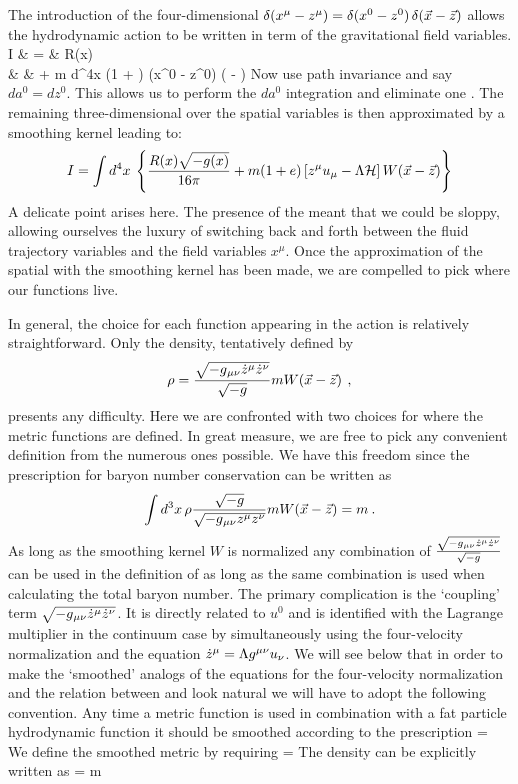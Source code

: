 The introduction of the four-dimensional \dfunc $\delta(x^{\mu} -
z^{\mu}) = \delta(x^0 - z^0) \, \delta(\vec {x} - \vec {z})$ allows the
hydrodynamic action to be written in term of the gravitational
field variables. \beas
I & = &   R(x)  \\
  &   & + m  d^4x \push (1 + \erg)  \gd(x^0 - z^0) \gd( - ) \eeas Now
use path invariance and say $da^0 = dz^0$.  This allows us to
perform the $da^0$ integration and eliminate one \dfunc. The
remaining three-dimensional \dfunc over the spatial variables is
then approximated by a smoothing kernel leading to:
\[
I =  \int d^4x \: \left\{ { \frac{R(x) \sqrt{-g(x)}}{16 \pi} + m
(1 + e) \left[ {  {z}{{}^{\mu} }   {u}{{}_{\mu} }  - \Lambda\mathcal{H} } \right]
W\!\left( {\vec {x} - \vec {z}} \right) } \right\}
\]
A delicate point arises here.  The presence of the \dfuncs meant
that we could be sloppy, allowing ourselves the luxury of
switching back and forth between the fluid trajectory variables
\ptraj{\gm} and the field variables $x^\mu$.  Once the
approximation of the spatial \dfuncs with the smoothing kernel has
been made, we are compelled to pick where our functions live.

In general, the choice for each function appearing in the action
is relatively straightforward.  Only the density, tentatively
defined by
\[
  \rho = \frac { \sqrt{- {g}{{}_{\mu \nu} }   {\dot {{z}}}{{}^{\mu} }   {\dot {{z}}}{{}^{\nu} } }}
              { \sqrt{-g}} m W\!\left( {\vec {x} - \vec {z}} \right) \: ,
\]
presents any difficulty.  Here we are confronted with two choices
for where the metric functions are defined.  In great measure, we
are free to pick any convenient definition from the numerous ones
possible. We have this freedom since the prescription for baryon
number conservation can be written as
\[
  \int d^3x \, \rho \frac{ \sqrt{-g}}
                         { \sqrt{- {g}{{}_{\mu \nu} }   {z}{{}^{\mu} }   {z}{{}^{\nu} } }}
                         m W\!\left( {\vec {x} - \vec {z}} \right)
  = m \: .
\]
As long as the smoothing kernel $W$ is normalized any combination
of $\frac{ \sqrt{- {g}{{}_{\mu \nu} }   {\dot {{z}}}{{}^{\mu} }   {\dot {{z}}}{{}^{\nu} }  }}{
\sqrt{-g}}$ can be used in the definition of \gr as long as the
same combination is used when calculating the total baryon number.
The primary complication is the `coupling' term
$\sqrt{- {g}{{}_{\mu \nu} }   {\dot {{z}}}{{}^{\mu} }   {\dot {{z}}}{{}^{\nu} }  }$. It is
directly related to $u^0$ and is identified with the Lagrange
multiplier \gL in the continuum case by simultaneously using the
four-velocity normalization and the equation $ {\dot {{z}}}{{}^{\mu} }  = \Lambda
 {g}{\ensuremath{{}^{\mu \nu} } }   {u}{\ensuremath{{}_{\nu} } } $.  We will see below that in order to
make the `smoothed' analogs of the equations for the four-velocity
normalization and the relation between \pdtraj{\gm} and \pvel{\gm}
look natural we will have to adopt the following convention.  Any
time a metric function is used in combination with a fat particle
hydrodynamic function it should be smoothed according to the
prescription \be\label{eq:inv_sm_met}
  \simet{\gm\gn}\parg =  \imet{\gm}{\gn}\farg {} \eqp
\ee We define the smoothed metric \sura{\met{\gm}{\gn}} by
requiring \be\label{eq:sm_met} \simet{\gm\gn} \smet{\gn\gr} =
\Kd{\gm}{\gr} \eqp \ee The density can be explicitly written as
\be\label{eq:rho_def}
    \gr = m \frac{ \sqrt{-\smet{\gm\gn} \pdtraj{\gm} \pdtraj{\gn}}}
                 { }  \eqp
\ee

